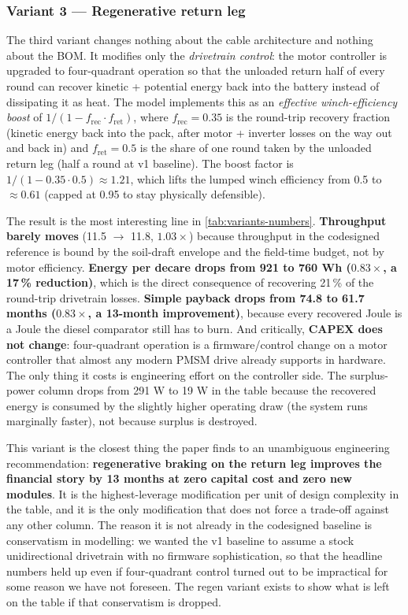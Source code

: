 \documentclass[11pt,a4paper]{article}
\begin{document}
\subsubsection{Variant 3 --- Regenerative return leg}\label{sec:variant-regen}

The third variant changes nothing about the cable architecture and nothing about the BOM. It modifies only the \emph{drivetrain control}: the motor controller is upgraded to four-quadrant operation so that the unloaded return half of every round can recover kinetic + potential energy back into the battery instead of dissipating it as heat. The model implements this as an \emph{effective winch-efficiency boost} of $1 / (1 - f_{\text{rec}} \cdot f_{\text{ret}})$, where $f_{\text{rec}} = 0.35$ is the round-trip recovery fraction (kinetic energy back into the pack, after motor + inverter losses on the way out and back in) and $f_{\text{ret}} = 0.5$ is the share of one round taken by the unloaded return leg (half a round at v1 baseline). The boost factor is $1 / (1 - 0.35 \cdot 0.5) \approx 1.21$, which lifts the lumped winch efficiency from 0.5 to ${\approx}0.61$ (capped at 0.95 to stay physically defensible).

The result is the most interesting line in \cref{tab:variants-numbers}. \textbf{Throughput barely moves} (11.5 $\to$ 11.8, $1.03\times$) because throughput in the codesigned reference is bound by the soil-draft envelope and the field-time budget, not by motor efficiency. \textbf{Energy per decare drops from 921 to 760 Wh ($0.83\times$, a 17\,\% reduction)}, which is the direct consequence of recovering 21\,\% of the round-trip drivetrain losses. \textbf{Simple payback drops from 74.8 to 61.7 months ($0.83\times$, a 13-month improvement)}, because every recovered Joule is a Joule the diesel comparator still has to burn. And critically, \textbf{CAPEX does not change}: four-quadrant operation is a firmware/control change on a motor controller that almost any modern PMSM drive already supports in hardware. The only thing it costs is engineering effort on the controller side. The surplus-power column drops from 291 W to 19 W in the table because the recovered energy is consumed by the slightly higher operating draw (the system runs marginally faster), not because surplus is destroyed.

This variant is the closest thing the paper finds to an unambiguous engineering recommendation: \textbf{regenerative braking on the return leg improves the financial story by 13 months at zero capital cost and zero new modules}. It is the highest-leverage modification per unit of design complexity in the table, and it is the only modification that does not force a trade-off against any other column. The reason it is not already in the codesigned baseline is conservatism in modelling: we wanted the v1 baseline to assume a stock unidirectional drivetrain with no firmware sophistication, so that the headline numbers held up even if four-quadrant control turned out to be impractical for some reason we have not foreseen. The regen variant exists to show what is left on the table if that conservatism is dropped.
\end{document}
